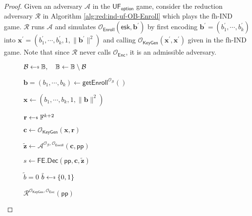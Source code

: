 \begin{proof}

Given an adversary $\mathcal{A}$ in the $\textsf{UF}_{\textsf{option}}$ game, consider the reduction adversary $\mathcal{R}$ in Algorithm \ref{alg:red:ind-uf-OB-Enroll} which plays the \textsf{fh-IND} game. $\mathcal{R}$ runs $\mathcal{A}$ and simulates $\mathcal{O}_{\textsf{Enroll}}( \textsf{esk}, \mathbf{b}^\prime )$ by first encoding $\mathbf{b}^\prime = (b_1^\prime, \cdots, b_k^\prime)$ into $\mathbf{x}^\prime = (b_1^\prime, \cdots, b_k^\prime, 1, \|\mathbf{b}^\prime\|^2)$ and calling $\mathcal{O}_{\textsf{KeyGen}}(\mathbf{x}^\prime, \mathbf{x}^\prime)$ given in the \textsf{fh-IND} game.  Note that since $\mathcal{R}$ never calls $\mathcal{O}_{\textsf{Enc}}$, it is an admissible adversary.

\begin{figure}[h]
\centering
	
	\begin{minipage}[t]{0.5\linewidth}
	\centering
	\begin{algorithm}[H]
	\caption{$\mathcal{R}^{\mathcal{O}_{\textsf{KeyGen}}, \mathcal{O}_{\textsf{Enc}}}(\textsf{pp})$}
	\label{alg:red:ind-uf-OB-Enroll}
	\begin{algorithmic}[1]
		\State $\mathcal{B} \getsdollar \mathbb{B}, \quad \mathbb{B} \gets \mathbb{B} \setminus \mathcal{B}$ \label{alg:red:ind-uf-OB-Enroll:B}

		\State $\mathbf{b} = (b_1, \cdots, b_k) \gets \textsf{getEnroll}^{\mathcal{O}_{\mathcal{B}}}()$

		\State $\mathbf{x} \gets (b_1, \cdots, b_k, 1, \|\mathbf{b}\|^2)$

		\State $\mathbf{r} \getsdollar \mathbb{F}^{k+2}$
		
		\State $\mathbf{c} \gets \mathcal{O}_{\textsf{KeyGen}}(\mathbf{x}, \mathbf{r})$ \label{alg:red:ind-uf-OB-Enroll:c}

		\State ${\mathbf{\tilde{z}}} \gets {\mathcal{A}}^{\mathcal{O}_\mathcal{B}, \mathcal{O}_\textsf{Enroll} } ( \mathbf{c}, \textsf{pp})$ \label{alg:red:ind-uf-OB-Enroll:A}

		\State $s \gets \textsf{FE.Dec}( \textsf{pp}, \mathbf{c}, \mathbf{\tilde{z}} )$

		 \label{alg:red:ind-uf-OB-Enroll:verify}
			\State \Return $\tilde{b} = 0$
		\Else
			\State \Return $\tilde{b} \getsdollar \{0, 1\}$
		\EndIf

	\end{algorithmic}
	\end{algorithm}
	\end{minipage}
	

\end{figure}
\end{proof}
